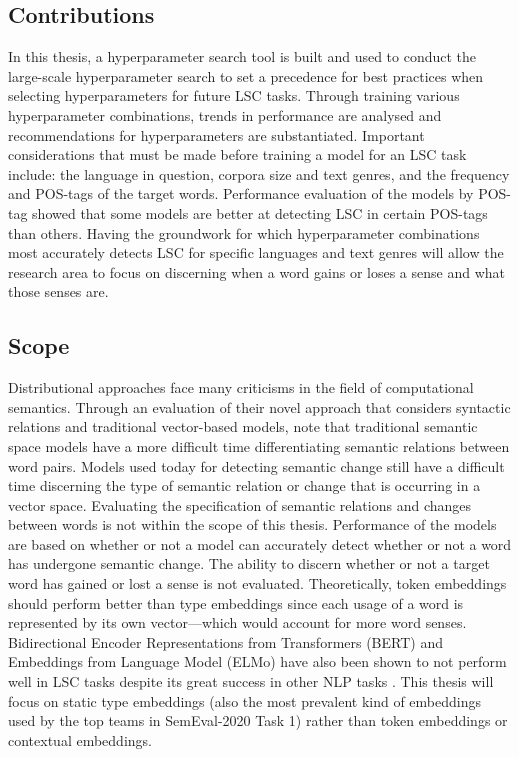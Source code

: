 \subsection{Contributions}
In this thesis, a hyperparameter search tool is built and used to conduct the large-scale hyperparameter search to set a precedence for best practices when selecting hyperparameters for future LSC tasks. Through training various hyperparameter combinations, trends in performance are analysed and recommendations for hyperparameters are substantiated. Important considerations that must be made before training a model for an LSC task include: the language in question, corpora size and text genres, and the frequency and POS-tags of the target words. Performance evaluation of the models by POS-tag showed that some models are better at detecting LSC in certain POS-tags than others. Having the groundwork for which hyperparameter combinations most accurately detects LSC for specific languages and text genres will allow the research area to focus on discerning when a word gains or loses a sense and what those senses are. 


\subsection{Scope}
\label{intro-scope}
Distributional approaches face many criticisms in the field of computational semantics. Through an evaluation of their novel approach that considers syntactic relations and traditional vector-based models, \citet{pado-lapata-2003-constructing} note that traditional semantic space models have a more difficult time differentiating semantic relations between word pairs. Models used today for detecting semantic change still have a difficult time discerning the type of semantic relation or change that is occurring in a vector space. Evaluating the specification of semantic relations and changes between words is not within the scope of this thesis. Performance of the models are based on whether or not a model can accurately detect whether or not a word has undergone semantic change. The ability to discern whether or not a target word has gained or lost a sense is not evaluated. Theoretically, token embeddings should perform better than type embeddings since each usage of a word is represented by its own vector—which would account for more word senses. Bidirectional Encoder Representations from Transformers (BERT) and Embeddings from Language Model (ELMo) have also been shown to not perform well in LSC tasks despite its great success in other NLP tasks \citep{schlechtweg-etal-2020-semeval}. This thesis will focus on static type embeddings (also the most prevalent kind of embeddings used by the top teams in SemEval-2020 Task 1) rather than token embeddings or contextual embeddings. 

